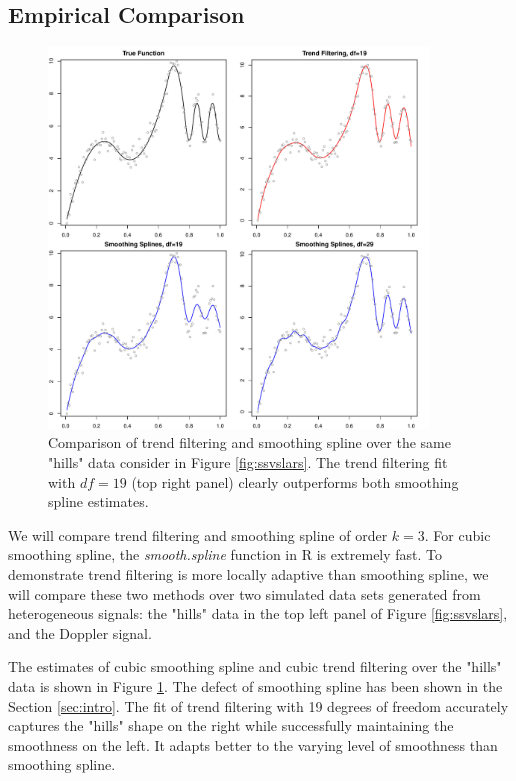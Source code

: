 \documentclass[a4paper]{article}
\begin{document}
\subsection{Empirical Comparison}
\label{subsec:sssimu}
\begin{figure}[t!]
\centering
\includegraphics[width = 0.9\textwidth]{Figures/Figure4.pdf}
\caption{Comparison of trend filtering and smoothing spline over the same "hills" data consider in Figure \ref{fig:ssvslars}. The trend filtering fit with $df = 19$ (top right panel) clearly outperforms both smoothing spline estimates.}
\label{fig:Figure4_ssvstfhills}
\end{figure}

We will compare trend filtering and smoothing spline of order $k = 3$. For cubic smoothing spline, the \textit{smooth.spline} function in R is extremely fast. To demonstrate trend filtering is more locally adaptive than smoothing spline, we will compare these two methods over two  simulated data sets generated from heterogeneous signals: the "hills" data in the top left panel of Figure \ref{fig:ssvslars}, and the Doppler signal. 


The estimates of cubic smoothing spline and cubic trend filtering over the "hills" data  is shown in Figure \ref{fig:Figure4_ssvstfhills}. The defect of smoothing spline has been shown in the Section \ref{sec:intro}. The fit of trend filtering with 19 degrees of freedom accurately captures the "hills" shape on the right while successfully maintaining the smoothness on the left. It adapts better to the varying level of smoothness than smoothing spline.
\end{document}
